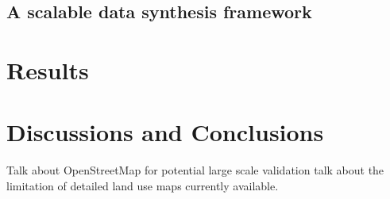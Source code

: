\documentclass[a4paper, 11pt]{article}
\begin{document}
\subsection{A scalable data synthesis framework}


\section{Results}


\section{Discussions and Conclusions}
Talk about OpenStreetMap for potential large scale validation
talk about the limitation of detailed land use maps currently available.





\end{document}
